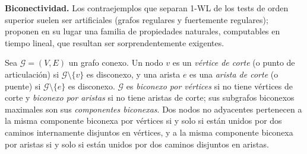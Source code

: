 \textbf{Biconectividad.} Los contraejemplos que separan 1-WL de los tests de orden superior suelen ser artificiales (grafos regulares y fuertemente regulares); \citet{zhang2023biconnectivity} proponen en su lugar una familia de propiedades naturales, computables en tiempo lineal, que resultan ser sorprendentemente exigentes.

\begin{definition}\label{def:biconectividad}
	Sea $\mathcal{G} = (V, E)$ un grafo conexo. Un nodo $v$ es un \textit{vértice de corte} (o punto de articulación) si $\mathcal{G} \setminus \{v\}$ es disconexo, y una arista $e$ es una \textit{arista de corte} (o puente) si $\mathcal{G} \setminus \{e\}$ es disconexo. $\mathcal{G}$ es \textit{biconexo por vértices} si no tiene vértices de corte y \textit{biconexo por aristas} si no tiene aristas de corte; sus subgrafos biconexos maximales son sus \textit{componentes biconexas}. Dos nodos no adyacentes pertenecen a la misma componente biconexa por vértices si y solo si están unidos por dos caminos internamente disjuntos en vértices, y a la misma componente biconexa por aristas si y solo si están unidos por dos caminos disjuntos en aristas.
\end{definition}

